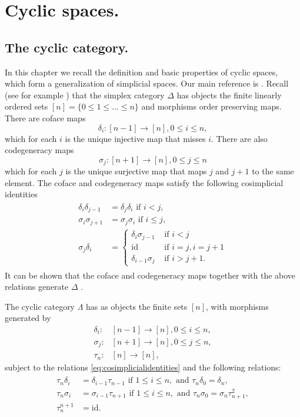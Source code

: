 \chapter{Cyclic spaces.}
\section{The cyclic category.}
In this chapter we recall the definition and basic properties of cyclic spaces, which form a
generalization of simplicial spaces. Our main reference is \cite[Chapters~6-7]{loday}.
Recall (see for example \cite[Chapter VI.7]{maclane}) 
that the simplex category $\Delta$ has objects the finite linearly ordered sets 
$[n]=\{0\le 1\le\ldots\le n\}$
and morphisms order preserving maps. There are coface maps
$$\delta_i:[n-1]\to [n], 0\le i\le n,$$
which for each $i$ is the unique injective map that misses $i$. There are also codegeneracy maps
$$\sigma_j:[n+1]\to [n], 0\le j\le n$$
which for each $j$ is the unique surjective map that maps $j$ and $j+1$ 
to the same element. The coface and codegeneracy maps satisfy the 
following cosimplicial identities
\begin{align}\label{eq:cosimplicialidentities}
\begin{split}
\delta_i\delta_{j-1} &= \delta_j\delta_i \text{ if } i < j,\\
\sigma_i\sigma_{j+1} &= \sigma_j \sigma_i \text{ if } i\le j,\\
\sigma_j \delta_i &= 
\begin{cases} 
\delta_i \sigma_{j-1}  &\text{ if } i<j\\
\mathrm{id}  &\text{ if } i=j, i = j+1\\
\delta_{i-1} \sigma_{j}  &\text{ if } i>j+1.
\end{cases}
\end{split}
\end{align}
It can be shown that the coface and codegeneracy maps together with the above relations
generate $\Delta$ \cite[Proposition~2, \pno~178]{maclane}.

\begin{mydef}
The cyclic category $\Lambda$ has as objects the finite sets $[n]$,
with morphisms generated by 
\begin{align*}
\delta_i:&[n-1]\to [n], 0\le i\le n,\\
\sigma_j:&[n+1]\to [n], 0\le j\le n,\\
\tau_n:&[n]\to [n],
\end{align*}
subject to the relations \eqref{eq:cosimplicialidentities} and the
following relations:
\begin{align}\label{eq:cocyclicidentities}
\begin{split}
\tau_n\delta_i &= \delta_{i-1} \tau_{n-1} \text{ if } 1\le i\le n, 
\text{ and }\tau_n\delta_0 = \delta_n,\\
\tau_n\sigma_i &= \sigma_{i-1}\tau_{n+1} \text{ if } 1\le i \le n,
\text{ and }\tau_n\sigma_0 = \sigma_n \tau^2_{n+1},\\
\tau_n^{n+1} &= \mathrm{id}.
\end{split}
\end{align}
\end{mydef}

